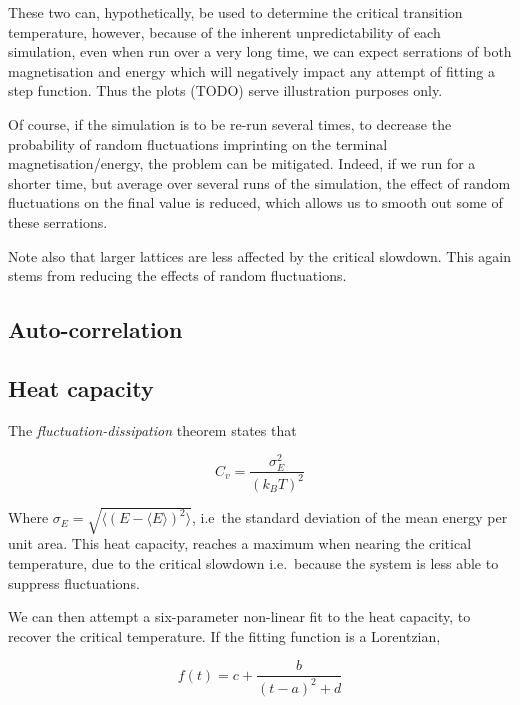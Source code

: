 \documentclass[11pt]{article}
\begin{document}
These two can, hypothetically,  be used to determine the critical transition temperature, however, because of the inherent unpredictability of each simulation, even when run over a very long time, we can expect serrations of both magnetisation and energy which will negatively impact any attempt of fitting a step function. Thus the plots (TODO) serve illustration purposes only.

Of course, if the simulation is to be re-run several times, to decrease the probability of random fluctuations imprinting on the terminal magnetisation/energy, the problem can be mitigated. Indeed, if we run for a shorter time, but average over several runs of the simulation, the effect of random fluctuations on the final value is reduced, which allows us to smooth out some of these serrations. 

Note also that larger lattices are less affected by the critical slowdown. This again stems from reducing the effects of random fluctuations. 

\subsection{Auto-correlation}

\subsection{Heat capacity }\label{sec:heat_capacity}

The \emph{fluctuation-dissipation} theorem states that

\begin{equation}\label{eq:fluctuation-dissipation theorem}
  C_v = \frac{\sigma_E^2}{ {(k_B T)}^2}
\end{equation}

Where \( \sigma_E = \sqrt{\langle  {(E - \langle E \rangle)}^2 \rangle}\), i.e~the standard deviation of the mean energy per unit area. This heat capacity, reaches a maximum when nearing the critical temperature, due to the critical slowdown i.e.~because the system is less able to suppress fluctuations.

We can then attempt a six-parameter non-linear fit to the heat capacity, to recover the critical temperature. If the fitting function is a Lorentzian,

\begin{equation}\label{eq:Lorentzian}
  f(t) = c + \frac{b}{{(t - a)}^2 + d}
\end{equation}
\end{document}
